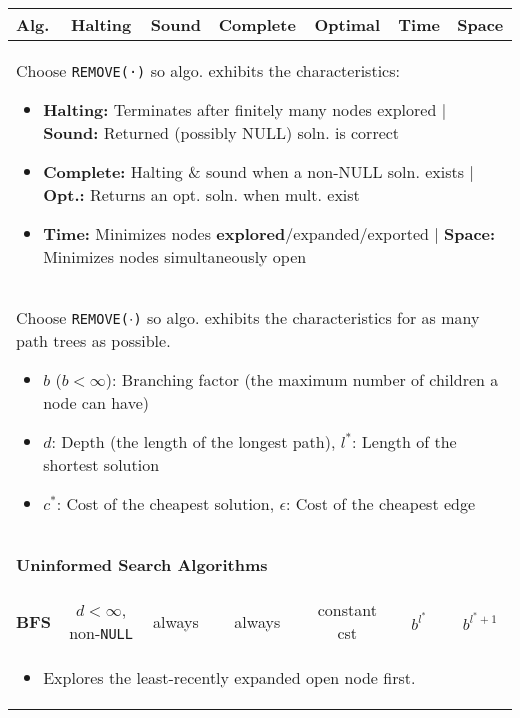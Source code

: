 \begin{summary}
    \begin{center}
        \begin{tabular}{lcccccc}
        \toprule
        \textbf{Alg.} & Halting & Sound & Complete & Optimal & Time & Space \\
        \midrule
        \multicolumn{7}{p{\linewidth}}{
            Choose \texttt{REMOVE(·)} so algo. exhibits the characteristics:
            \begin{itemize}
                \item \textbf{Halting:} Terminates after finitely many nodes explored $\mid$ \textbf{Sound:} Returned (possibly NULL) soln. is correct 
                \item \textbf{Complete:} Halting \& sound when a non-NULL soln. exists $\mid$ \textbf{Opt.:} Returns an opt. soln. when mult. exist 
                \item \textbf{Time:} Minimizes nodes \textbf{explored}/expanded/exported $\mid$ \textbf{Space:} Minimizes nodes simultaneously open
            \end{itemize}} \\
        \midrule
        \multicolumn{7}{p{\linewidth}}{
            Choose \texttt{REMOVE($\cdot$)} so algo. exhibits the characteristics for as many path trees as possible. 
            \begin{itemize}
                \item $b$ ($b < \infty$): Branching factor (the maximum number of children a node can have)
                \item $d$: Depth (the length of the longest path), $l^*$: Length of the shortest solution
                \item $c^*$: Cost of the cheapest solution, $\epsilon$: Cost of the cheapest edge
            \end{itemize}} \\
        \midrule
        \multicolumn{7}{p{\linewidth}}{
        \begin{center}
            \textbf{Uninformed Search Algorithms}
        \end{center}} \\
        \midrule
        \textbf{BFS} & $d<\infty$, non-\texttt{NULL} & always & always & constant cst & $b^{l^{*}}$ & $b^{l^{*} + 1}$ \\
        \multicolumn{7}{p{\linewidth}}{
        \begin{itemize}
            \item Explores the least-recently expanded open node first.

\end{itemize}}
\end{tabular}
\end{center}
\end{summary}
